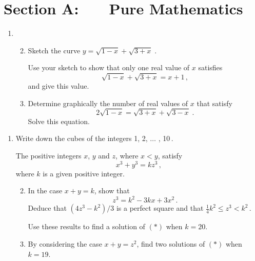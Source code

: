 \documentclass[a4, 11pt]{report}
\newlength{\qspace}
\newcounter{qnumber}
\newenvironment{question}%
 {\vspace{\qspace}
  \begin{enumerate}[\bfseries 1\quad][10]%
    \setcounter{enumi}{\value{qnumber}}%
    \item%
 }
{
  \end{enumerate}
  \filbreak
  \stepcounter{qnumber}
 }
\newenvironment{questionparts}[1][1]%
 {
  \begin{enumerate}[\bfseries (i)]%
    \setcounter{enumii}{#1}
    \addtocounter{enumii}{-1}
    \setlength{\itemsep}{5mm}
    \setlength{\parskip}{8pt}
 }
 {
  \end{enumerate}
 }
\def\le{\leqslant}
\begin{document}
\setcounter{page}{2}

 
\section*{Section A: \ \ \ Pure Mathematics}

\begin{question}
\begin{questionparts}
\item
Sketch the curve  $y=\sqrt{1-x} + \sqrt{3+x}\;$.

Use your sketch to show that only one  real value of $x$  satisfies
\[
\sqrt{1-x} + \sqrt{3+x} = x+1\,,
\]
and give this value.

\item
Determine graphically the number of real values of $x$ that satisfy
\[
2\sqrt{1-x} = \sqrt{3+x} + \sqrt{3-x}\;.
\]
Solve this equation.         
\end{questionparts}
\end{question}

\begin{question}
Write down the cubes of the integers 1, 2, $\ldots$ , 10\,.

The positive integers $x$, $y$ and $z$, where $x<y$, satisfy
\[
x^3+y^3 = kz^3\,,
\tag{$*$}
\]
where $k$ is a given positive integer.

\begin{questionparts}
\item
In the case  $x+y =k$, show that 
\[
z^3 = k^2  -3kx+3x^2\,.
\]
Deduce that $(4z^3 - k^2)/3$ is a perfect square
and that $\frac14 {k^2} \le z^3 < k^2\,$.

Use these results to  find a solution of $(*)$ when $k=20$.

\item By considering the case $x+y = z^2$, 
find two solutions of $(*)$ when  
$k=19$. 

\end{questionparts}
\end{question}
\end{document}
